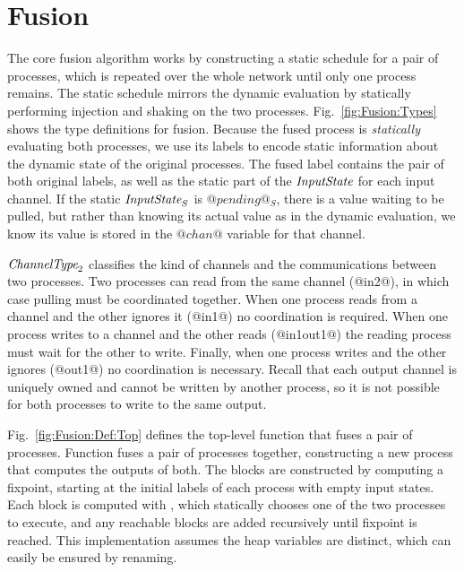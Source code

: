 
\section{Fusion}
\label{s:Fusion}


The core fusion algorithm works by constructing a static schedule for a pair of processes, which is repeated over the whole network until only one process remains.
The static schedule mirrors the dynamic evaluation by statically performing injection and shaking on the two processes.
Fig.~\ref{fig:Fusion:Types} shows the type definitions for fusion.
Because the fused process is \emph{statically} evaluating both processes, we use its labels to encode static information about the dynamic state of the original processes.
The fused label contains the pair of both original labels, as well as the static part of the $\textit{InputState}$ for each input channel.
If the static $\textit{InputState}_S$ is $@pending@_S$, there is a value waiting to be pulled, but rather than knowing its actual value as in the dynamic evaluation, we know its value is stored in the $@chan@$ variable for that channel.

$\textit{ChannelType}_2$ classifies the kind of channels and the communications between two processes.
Two processes can read from the same channel (@in2@), in which case pulling must be coordinated together.
When one process reads from a channel and the other ignores it (@in1@) no coordination is required.
When one process writes to a channel and the other reads (@in1out1@) the reading process must wait for the other to write.
Finally, when one process writes and the other ignores (@out1@) no coordination is necessary.
Recall that each output channel is uniquely owned and cannot be written by another process, so it is not possible for both processes to write to the same output.





Fig.~\ref{fig:Fusion:Def:Top} defines the top-level function that fuses a pair of processes.
Function  fuses a pair of processes together, constructing a new process that computes the outputs of both.
The blocks are constructed by computing a fixpoint, starting at the initial labels of each process with empty input states.
Each block is computed with , which statically chooses one of the two processes to execute, and any reachable blocks are added recursively until fixpoint is reached.
This implementation assumes the heap variables are distinct, which can easily be ensured by renaming.

